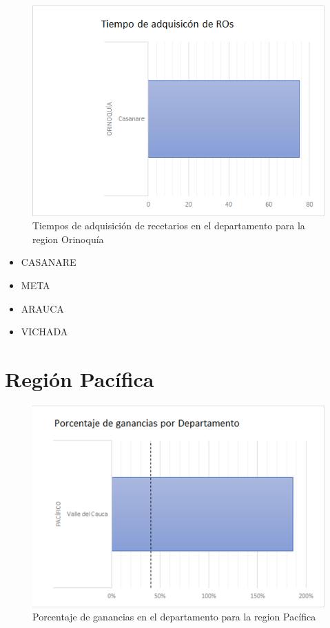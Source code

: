 \documentclass[
]{book}
\providecommand{\tightlist}{%
  \setlength{\itemsep}{0pt}\setlength{\parskip}{0pt}}
\begin{document}
\begin{figure}

{\centering \includegraphics[width=0.5\linewidth]{figures/Imagen31} 

}

\caption{Tiempos de adquisición de recetarios en el departamento para la region Orinoquía}\label{fig:tiemposAdquisicionRegionOrinoquia}
\end{figure}

\begin{itemize}
\tightlist
\item
  CASANARE
\item
  META
\item
  ARAUCA
\item
  VICHADA
\end{itemize}

\hypertarget{regiuxf3n-pacuxedfica}{%
\section{Región Pacífica}\label{regiuxf3n-pacuxedfica}}

\begin{figure}

{\centering \includegraphics[width=0.5\linewidth]{figures/Imagen40} 

}

\caption{Porcentaje de ganancias en el departamento para la region Pacífica}\label{fig:porcentajeGananciasRegionPacifica}
\end{figure}
\end{document}
